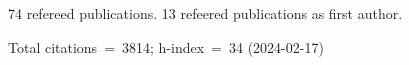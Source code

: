 74 refereed publications. 13 refeered publications as first author.

Total citations~=~3814; h-index~=~34 (2024-02-17)